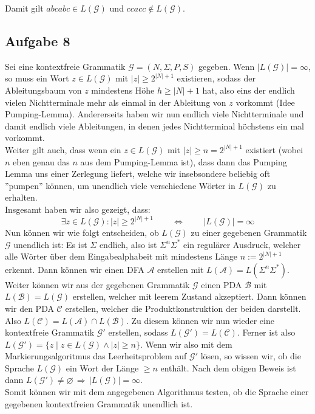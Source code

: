 \documentclass[a4paper,graphics,11pt]{article}
\newcommand{\aufgabe}[1]{\subsection*{Aufgabe #1}}
\begin{document}
Damit gilt $abcabc \in L(\mathcal{G})$ und $ccacc \notin L(\mathcal{G})$.

\aufgabe{8}
Sei eine kontextfreie Grammatik $\mathcal{G} = (N, \Sigma, P, S)$ gegeben.
Wenn $|L(\mathcal{G})| = \infty$, so muss ein Wort $z \in L(\mathcal{G})$
mit $|z| \geq 2^{|N|+1}$ existieren, sodass der Ableitungsbaum
von $z$ mindestens Höhe $h \geq |N| + 1$ hat, also eins der endlich vielen
Nichtterminale mehr als einmal in der Ableitung von $z$ vorkommt (Idee Pumping-Lemma).
Andererseits haben wir nun endlich viele Nichtterminale und damit endlich viele
Ableitungen, in denen jedes Nichtterminal höchstens ein mal vorkommt.\\
Weiter gilt auch, dass wenn ein $z \in L(\mathcal{G})$ mit $|z| \geq n = 2^{|N|+1}$
existiert (wobei $n$ eben genau das $n$ aus dem Pumping-Lemma ist), dass
dann das Pumping Lemma uns einer Zerlegung liefert, welche wir insebsondere beliebig
oft ''pumpen'' können, um unendlich viele verschiedene Wörter in $L(\mathcal{G})$ 
zu erhalten.\\
Insgesamt haben wir also gezeigt, dass:
$$
    \exists z \in L(\mathcal{G}) : |z| \geq 2^{|N|+1}
    \qquad \,\Longleftrightarrow\,\qquad
    |L(\mathcal{G})| = \infty
$$
Nun können wir wie folgt entscheiden, ob $L(\mathcal{G})$ zu einer gegebenen 
Grammatik $\mathcal{G}$ unendlich ist:
Es ist $\Sigma$ endlich, also ist $\Sigma^n\Sigma^*$ ein regulärer Ausdruck,
welcher alle Wörter über dem Eingabealphabeit mit mindestens Länge $n := 2^{|N|+1}$
erkennt. Dann können wir einen DFA $\mathcal{A}$ erstellen mit $L(\mathcal{A}) =
L(\Sigma^n\Sigma^*)$. Weiter können wir aus der gegebenen Grammatik $\mathcal{G}$
einen PDA $\mathcal{B}$ mit $L(\mathcal{B}) = L(\mathcal{G})$ erstellen, welcher
mit leerem Zustand akzeptiert. Dann können wir den PDA $\mathcal{C}$ erstellen, welcher
die Produktkonstruktion der beiden darstellt.
Also $L(\mathcal{C}) = L(\mathcal{A}) \cap L(\mathcal{B})$.
Zu diesem können wir nun wieder eine kontextfreie Grammatik $\mathcal{G}'$ erstellen,
sodass $L(\mathcal{G}') = L(\mathcal{C}) $. Ferner ist also
$L(\mathcal{G}') = \{z \mid z \in L(\mathcal{G}) \land |z| \geq n\}$.
Wenn wir also mit dem Markierungsalgoritmus das Leerheitsproblem auf $\mathcal{G}'$
lösen, so wissen wir, ob die Sprache $L(\mathcal{G})$ ein Wort der Länge $\geq n$ enthält.
Nach dem obigen Beweis ist dann
$
    L(\mathcal{G}') \neq \varnothing \,\Longrightarrow\, |L(\mathcal{G})| = \infty
$.\\
Somit können wir mit dem angegebenen Algorithmus testen, ob die Sprache einer
gegebenen kontextfreien Grammatik unendlich ist.
\end{document}
